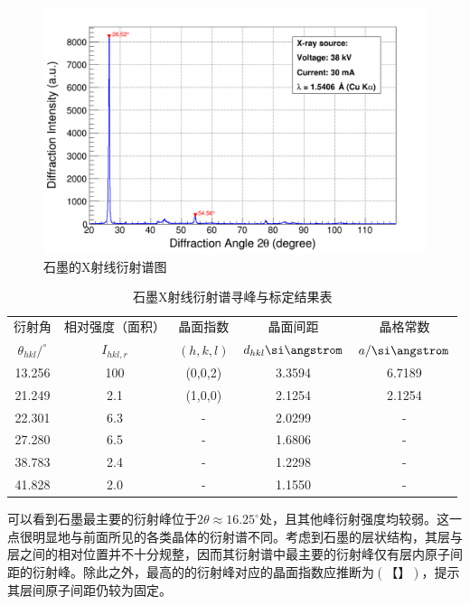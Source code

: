 \documentclass{thuemp}
\begin{document}
\begin{figure}[H]
    \centering
    \includegraphics[width=0.8\linewidth]{../Data/C-Graphite-multi.png}
    \caption{石墨的X射线衍射谱图}
    \label{fig:graphite_xrd}
\end{figure}

\begin{table}
    \centering
    \captionnamefont{\wuhao\bf\heiti}
    \captiontitlefont{\wuhao\bf\heiti}
    \caption{石墨X射线衍射谱寻峰与标定结果表}
    \label{tab:graphite_xrd}
    \liuhao
    \begin{tabular}{ccccc}
        \toprule
        衍射角 & 相对强度（面积）& 晶面指数 & 晶面间距 & 晶格常数 \\
        $\theta_{hkl}/^\circ$ & $I_{hkl,r}$ & $(h,k,l)$ & $d_{hkl}\text{\si\angstrom}$ & $a/\text{\si\angstrom}$\\
        \midrule
        13.256 & 100 & (0,0,2) & 3.3594 & 6.7189 \\
        21.249 & 2.1 & (1,0,0) & 2.1254 & 2.1254 \\
        22.301 & 6.3 &    -    & 2.0299 &   -    \\
        27.280 & 6.5 &    -    & 1.6806 &   -    \\
        38.783 & 2.4 &    -    & 1.2298 &   -    \\
        41.828 & 2.0 &    -    & 1.1550 &   -    \\
        \bottomrule
    \end{tabular}
\end{table}

可以看到石墨最主要的衍射峰位于$2\theta \approx 16.25^\circ$处，且其他峰衍射强度均较弱。这一点很明显地与前面所见的各类晶体的衍射谱不同。考虑到石墨的层状结构，其层与层之间的相对位置并不十分规整，因而其衍射谱中最主要的衍射峰仅有层内原子间距的衍射峰。除此之外，最高的的衍射峰对应的晶面指数应推断为$(【】)$，提示其层间原子间距仍较为固定。
\end{document}
